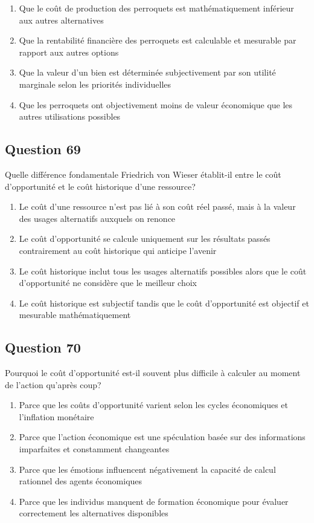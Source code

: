 \documentclass[12pt,a4paper]{article}
\begin{document}
\begin{enumerate}[label=\Alph*., leftmargin=*]
\item Que le coût de production des perroquets est mathématiquement inférieur aux autres alternatives
\item Que la rentabilité financière des perroquets est calculable et mesurable par rapport aux autres options
\item Que la valeur d'un bien est déterminée subjectivement par son utilité marginale selon les priorités individuelles
\item Que les perroquets ont objectivement moins de valeur économique que les autres utilisations possibles
\end{enumerate}

\bigskip


\subsection*{Question 69}
Quelle différence fondamentale Friedrich von Wieser établit-il entre le coût d'opportunité et le coût historique d'une ressource?

\begin{enumerate}[label=\Alph*., leftmargin=*]
\item Le coût d'une ressource n'est pas lié à son coût réel passé, mais à la valeur des usages alternatifs auxquels on renonce
\item Le coût d'opportunité se calcule uniquement sur les résultats passés contrairement au coût historique qui anticipe l'avenir
\item Le coût historique inclut tous les usages alternatifs possibles alors que le coût d'opportunité ne considère que le meilleur choix
\item Le coût historique est subjectif tandis que le coût d'opportunité est objectif et mesurable mathématiquement
\end{enumerate}

\bigskip


\subsection*{Question 70}
Pourquoi le coût d'opportunité est-il souvent plus difficile à calculer au moment de l'action qu'après coup?

\begin{enumerate}[label=\Alph*., leftmargin=*]
\item Parce que les coûts d'opportunité varient selon les cycles économiques et l'inflation monétaire
\item Parce que l'action économique est une spéculation basée sur des informations imparfaites et constamment changeantes
\item Parce que les émotions influencent négativement la capacité de calcul rationnel des agents économiques
\item Parce que les individus manquent de formation économique pour évaluer correctement les alternatives disponibles
\end{enumerate}
\end{document}
